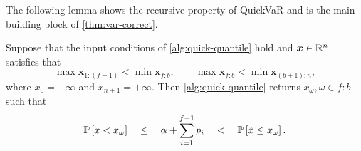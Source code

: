 The following lemma shows the recursive property of QuickVaR and is the main building block of \cref{thm:var-correct}.
\begin{lemma} \label{lem:quickvar-correct}
Suppose that the input conditions of \cref{alg:quick-quantile} hold and $\bm{x} \in \Real^n$ satisfies that
 \begin{equation} \label{eq:qvar-precondition}
  \max \bm{x}_{1{:}(f-1)} <  \min \bm{x}_{f{:}b},  \qquad
  \max \bm{x}_{f{:}b} < \min \bm{x}_{(b+1){:}n},
\end{equation} 
where $x_0 = -\infty$ and $x_{n+1} = +\infty$. Then \cref{alg:quick-quantile} returns $x_{\omega}, \omega\in f{:}b$ such that
\begin{equation} \label{eq:qvar-postcondition}
  \P{\tilde{x} < x_{\omega}}
  \quad \le \quad
  \alpha + \sum_{i=1}^{f-1} p_i 
  \quad < \quad \P{\tilde{x} \le x_{\omega}}.
\end{equation}
\end{lemma}
